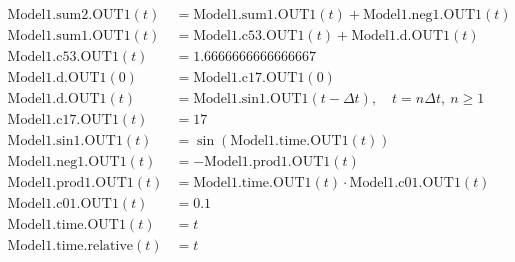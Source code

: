 \documentclass{article}
\begin{document}
\[
\begin{aligned}
\mathrm{Model1.sum2.OUT1}(t) &= \mathrm{Model1.sum1.OUT1}(t) + \mathrm{Model1.neg1.OUT1}(t) \\[4pt]
\mathrm{Model1.sum1.OUT1}(t) &= \mathrm{Model1.c53.OUT1}(t) + \mathrm{Model1.d.OUT1}(t) \\[4pt]
\mathrm{Model1.c53.OUT1}(t) &= 1.6666666666666667 \\[4pt]
\mathrm{Model1.d.OUT1}(0) &= \mathrm{Model1.c17.OUT1}(0) \\[4pt]
\mathrm{Model1.d.OUT1}(t) &= \mathrm{Model1.sin1.OUT1}(t-\Delta t), \quad t=n\Delta t,\ n\geq1 \\[4pt]
\mathrm{Model1.c17.OUT1}(t) &= 17 \\[4pt]
\mathrm{Model1.sin1.OUT1}(t) &= \sin\left(\mathrm{Model1.time.OUT1}(t)\right) \\[4pt]
\mathrm{Model1.neg1.OUT1}(t) &= -\mathrm{Model1.prod1.OUT1}(t) \\[4pt]
\mathrm{Model1.prod1.OUT1}(t) &= \mathrm{Model1.time.OUT1}(t) \cdot \mathrm{Model1.c01.OUT1}(t) \\[4pt]
\mathrm{Model1.c01.OUT1}(t) &= 0.1 \\[4pt]
\mathrm{Model1.time.OUT1}(t) &= t \\[4pt]
\mathrm{Model1.time.relative}(t) &= t
\end{aligned}
\]
\end{document}
